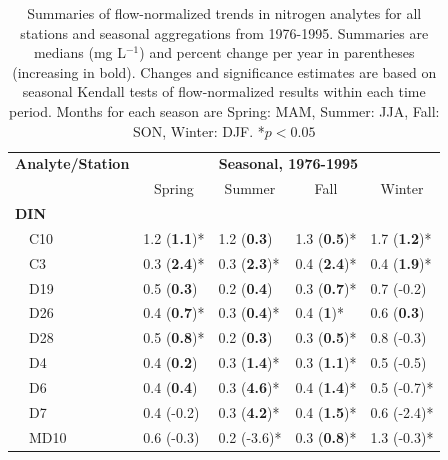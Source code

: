 \documentclass[letterpaper,12pt,oneside]{article}\usepackage[]{graphicx}\usepackage[]{color}
\begin{document}
\begin{table}[!tbp]
\caption{Summaries of flow-normalized trends in nitrogen analytes for all stations and seasonal aggregations from 1976-1995. Summaries are  medians (mg L$^{-1}$) and percent change per year in parentheses (increasing in bold). Changes and significance estimates are based on seasonal Kendall tests of flow-normalized results within each time period. Months for each season are Spring: MAM, Summer: JJA, Fall: SON, Winter: DJF. *$p<0.05$\label{tab:trndsbef}} 
\begin{center}
\begin{tabular}{lllll}
\hline\hline
\multicolumn{1}{l}{\bfseries Analyte/Station}&\multicolumn{4}{c}{\bfseries Seasonal, 1976-1995}\tabularnewline
\cline{2-5}
\multicolumn{1}{l}{}&\multicolumn{1}{c}{Spring}&\multicolumn{1}{c}{Summer}&\multicolumn{1}{c}{Fall}&\multicolumn{1}{c}{Winter}\tabularnewline
\hline
{\bfseries DIN}&&&&\tabularnewline
~~C10&1.2 \footnotesize{(\textbf{1.1})*}&1.2 \footnotesize{(\textbf{0.3})}&1.3 \footnotesize{(\textbf{0.5})*}&1.7 \footnotesize{(\textbf{1.2})*}\tabularnewline
~~C3&0.3 \footnotesize{(\textbf{2.4})*}&0.3 \footnotesize{(\textbf{2.3})*}&0.4 \footnotesize{(\textbf{2.4})*}&0.4 \footnotesize{(\textbf{1.9})*}\tabularnewline
~~D19&0.5 \footnotesize{(\textbf{0.3})}&0.2 \footnotesize{(\textbf{0.4})}&0.3 \footnotesize{(\textbf{0.7})*}&0.7 \footnotesize{(-0.2)}\tabularnewline
~~D26&0.4 \footnotesize{(\textbf{0.7})*}&0.3 \footnotesize{(\textbf{0.4})*}&0.4 \footnotesize{(\textbf{1})*}&0.6 \footnotesize{(\textbf{0.3})}\tabularnewline
~~D28&0.5 \footnotesize{(\textbf{0.8})*}&0.2 \footnotesize{(\textbf{0.3})}&0.3 \footnotesize{(\textbf{0.5})*}&0.8 \footnotesize{(-0.3)}\tabularnewline
~~D4&0.4 \footnotesize{(\textbf{0.2})}&0.3 \footnotesize{(\textbf{1.4})*}&0.3 \footnotesize{(\textbf{1.1})*}&0.5 \footnotesize{(-0.5)}\tabularnewline
~~D6&0.4 \footnotesize{(\textbf{0.4})}&0.3 \footnotesize{(\textbf{4.6})*}&0.4 \footnotesize{(\textbf{1.4})*}&0.5 \footnotesize{(-0.7)*}\tabularnewline
~~D7&0.4 \footnotesize{(-0.2)}&0.3 \footnotesize{(\textbf{4.2})*}&0.4 \footnotesize{(\textbf{1.5})*}&0.6 \footnotesize{(-2.4)*}\tabularnewline
~~MD10&0.6 \footnotesize{(-0.3)}&0.2 \footnotesize{(-3.6)*}&0.3 \footnotesize{(\textbf{0.8})*}&1.3 \footnotesize{(-0.3)*}\tabularnewline

\end{tabular}
\end{center}
\end{table}
\end{document}
